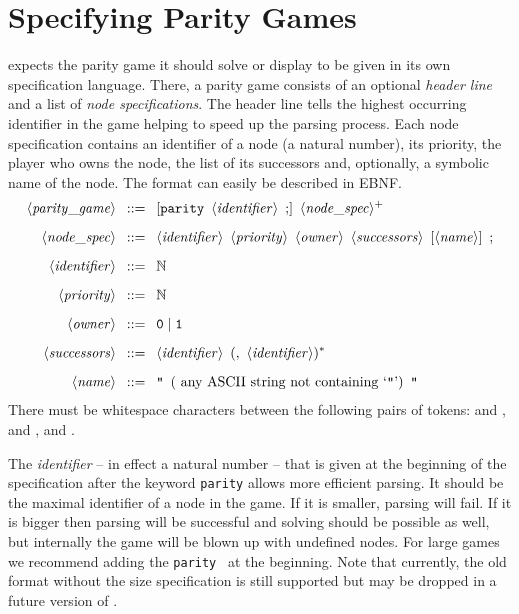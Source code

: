 \section{Specifying Parity Games}
\label{sec:specs}

\pgsolver expects the parity game it should solve or display to be given in its own
specification language. There, a parity game consists of an optional \emph{header line} and
a list of \emph{node specifications}. The header line tells \pgsolver the highest
occurring identifier in the game helping to speed up the parsing process. Each
node specification contains an identifier of a node (a natural number), its priority, the
player who owns the node, the list of its successors and, optionally, a symbolic
name of the node. The format can easily be described in EBNF. 
\begin{align*}
\langle\mathit{parity\_game}\rangle \enspace &::= \enspace [{\tt parity} \enspace \langle\mathit{identifier}\rangle \enspace {\tt ;}] \enspace \langle\mathit{node\_spec}\rangle^+ \\[2mm]
\langle\mathit{node\_spec}\rangle \enspace &::= \enspace \langle\mathit{identifier}\rangle \enspace
  \langle\mathit{priority}\rangle \enspace \langle\mathit{owner}\rangle \enspace \langle\mathit{successors}\rangle
  \enspace [\langle\mathit{name}\rangle] \enspace {\tt ;} \\[2mm]
\langle\mathit{identifier}\rangle \enspace &::= \enspace \mathbb{N} \\[2mm]
\langle\mathit{priority}\rangle \enspace &::= \enspace \mathbb{N} \\[2mm]
\langle\mathit{owner}\rangle \enspace &::= \enspace {\tt 0} \mid {\tt 1} \\[2mm]
\langle\mathit{successors}\rangle \enspace &::= \enspace \langle\mathit{identifier}\rangle\enspace
  ({\tt ,}\enspace \langle\mathit{identifier}\rangle)^* \\[2mm]
\langle\mathit{name}\rangle \enspace &::= \enspace \mbox{{\tt "}}\enspace
  (\mbox{ any ASCII string not containing `{\tt "}'}) \enspace \mbox{{\tt "}}
\end{align*}
There must be whitespace characters between the following pairs of tokens:
 and ,  and ,
 and .

The \textit{identifier} -- in effect a natural number -- that is given at the beginning of
the specification after the keyword \texttt{parity} allows more efficient parsing. It should be the
maximal identifier of a node in the game. If it is smaller, parsing will fail. If it is bigger
then parsing will be successful and solving should be possible as well, but internally the game
will be blown up with undefined nodes. For large games we recommend adding the 
\texttt{parity}\  at the beginning. Note that currently, the old format
without the size specification is still supported but may be dropped in a future version of
\pgsolver.

